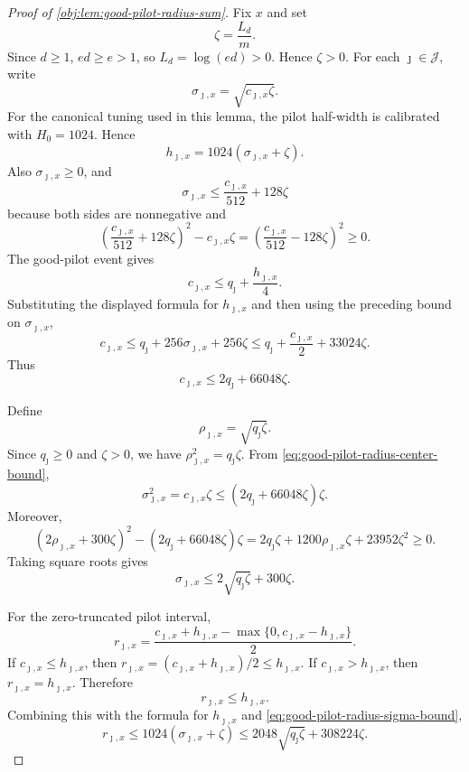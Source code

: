 \documentclass[11pt]{article}
\begin{document}
\begin{proof}[Proof of \cref{obj:lem:good-pilot-radius-sum}]
Fix \(x\) and set
\[
\zeta=\frac{L_d}{m}.
\]
Since \(d\ge 1\), \(ed\ge e>1\), so \(L_d=\log(ed)>0\). Hence \(\zeta>0\). For each \(\jmath\in\mathcal J\), write
\[
\sigma_{\jmath,x}=\sqrt{c_{\jmath,x}\zeta}.
\]
For the canonical tuning used in this lemma, the pilot half-width is calibrated with \(H_0=1024\). Hence
\[
h_{\jmath,x}=1024(\sigma_{\jmath,x}+\zeta).
\]
Also \(\sigma_{\jmath,x}\ge0\), and
\[
\sigma_{\jmath,x}\le \frac{c_{\jmath,x}}{512}+128\zeta
\]
because both sides are nonnegative and
\[
\left(\frac{c_{\jmath,x}}{512}+128\zeta\right)^2-c_{\jmath,x}\zeta
=
\left(\frac{c_{\jmath,x}}{512}-128\zeta\right)^2\ge0 .
\]
The good-pilot event gives
\[
c_{\jmath,x}\le q_\jmath+\frac{h_{\jmath,x}}4 .
\]
Substituting the displayed formula for \(h_{\jmath,x}\) and then using the preceding bound on
\(\sigma_{\jmath,x}\),
\[
c_{\jmath,x}
\le q_\jmath+256\sigma_{\jmath,x}+256\zeta
\le q_\jmath+\frac{c_{\jmath,x}}2+33024\zeta .
\]
Thus
\begin{equation}\label{eq:good-pilot-radius-center-bound}
c_{\jmath,x}\le 2q_\jmath+66048\zeta .
\end{equation}

Define
\[
\rho_{\jmath,x}=\sqrt{q_\jmath\zeta}.
\]
Since \(q_\jmath\ge0\) and \(\zeta>0\), we have \(\rho_{\jmath,x}^2=q_\jmath\zeta\). From \cref{eq:good-pilot-radius-center-bound},
\[
\sigma_{\jmath,x}^2
=
c_{\jmath,x}\zeta
\le
(2q_\jmath+66048\zeta)\zeta .
\]
Moreover,
\[
(2\rho_{\jmath,x}+300\zeta)^2-(2q_\jmath+66048\zeta)\zeta
=
2q_\jmath\zeta+1200\rho_{\jmath,x}\zeta+23952\zeta^2
\ge0 .
\]
Taking square roots gives
\begin{equation}\label{eq:good-pilot-radius-sigma-bound}
\sigma_{\jmath,x}\le 2\sqrt{q_\jmath\zeta}+300\zeta .
\end{equation}

For the zero-truncated pilot interval,
\[
r_{\jmath,x}
=
\frac{c_{\jmath,x}+h_{\jmath,x}-\max\{0,c_{\jmath,x}-h_{\jmath,x}\}}2 .
\]
If \(c_{\jmath,x}\le h_{\jmath,x}\), then \(r_{\jmath,x}=(c_{\jmath,x}+h_{\jmath,x})/2\le h_{\jmath,x}\). If
\(c_{\jmath,x}>h_{\jmath,x}\), then \(r_{\jmath,x}=h_{\jmath,x}\). Therefore
\[
r_{\jmath,x}\le h_{\jmath,x}.
\]
Combining this with the formula for \(h_{\jmath,x}\) and \cref{eq:good-pilot-radius-sigma-bound},
\begin{equation}\label{eq:good-pilot-radius-coordinate-bound}
r_{\jmath,x}
\le
1024(\sigma_{\jmath,x}+\zeta)
\le
2048\sqrt{q_\jmath\zeta}+308224\zeta .
\end{equation}


\end{proof}
\end{document}
